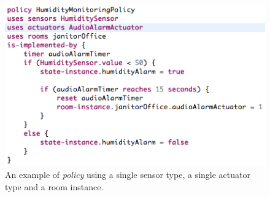 \begin{figure}[h]
  \centering
    \includegraphics[scale=.5]{dsl-policy-definition.png} 
	\caption{An example of \textit{policy} using a single sensor type, a single actuator type and a room instance.}
	\label{fig:dsl-policy-definition}
\end{figure}